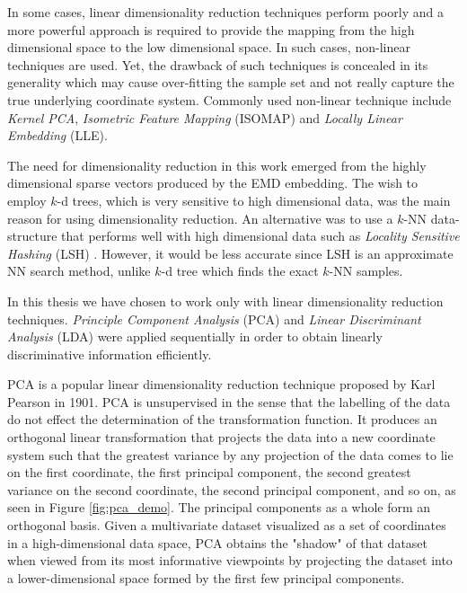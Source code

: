 \iftoggle{edit-mode}{\hspace{0pt}\marginpar{Non-Linear DR}}{}
In some cases, linear dimensionality reduction techniques perform poorly and a more powerful approach is required to provide the mapping from the high dimensional space to the low dimensional space. 
In such cases, non-linear techniques are used. 
Yet, the drawback of such techniques is concealed in its generality which may cause over-fitting the sample set and not really capture the true underlying coordinate system. 
Commonly used non-linear technique include \emph{Kernel PCA}, \emph{Isometric Feature Mapping} (ISOMAP) and \emph{Locally Linear Embedding} (LLE).

\iftoggle{edit-mode}{\hspace{0pt}\marginpar{Why do we need DR?}}{}
The need for dimensionality reduction in this work emerged from the highly dimensional sparse vectors produced by the EMD embedding. 
The wish to employ $k$-d trees, which is very sensitive to high dimensional data, was the main reason for using dimensionality reduction. 
An alternative was to use a $k$-NN data-structure that performs well with high dimensional data such as \emph{Locality Sensitive Hashing} (LSH) \cite{gionis1999similarity}. 
However, it would be less accurate since LSH is an approximate NN search method, unlike $k$-d tree which finds the exact $k$-NN samples.

\iftoggle{edit-mode}{\hspace{0pt}\marginpar{What DR we use?}}{}
In this thesis we have chosen to work only with linear dimensionality reduction techniques. 
\emph{Principle Component Analysis} (PCA) and \emph{Linear Discriminant Analysis} (LDA) were applied sequentially in order to obtain linearly discriminative information efficiently.

\iftoggle{edit-mode}{\hspace{0pt}\marginpar{PCA}}{}
PCA is a popular linear dimensionality reduction technique proposed by Karl Pearson \cite{pearson1901principal} in 1901. 
PCA is unsupervised in the sense that the labelling of the data do not effect the determination of the transformation function. 
It produces an orthogonal linear transformation that projects the data into a new coordinate system such that the greatest variance by any projection of the data comes to lie on the first coordinate, the first principal component, the second greatest variance on the second coordinate, the second principal component, and so on, as seen in Figure \ref{fig:pca_demo}. 
The principal components as a whole form an orthogonal basis. 
Given a multivariate dataset visualized as a set of coordinates in a high-dimensional data space, PCA obtains the "shadow" of that dataset when viewed from its most informative viewpoints by projecting the dataset into a lower-dimensional space formed by the first few principal components.


